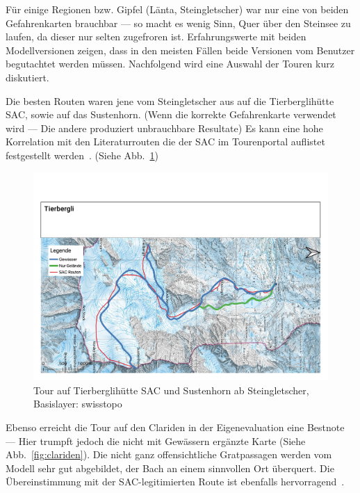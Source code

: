 Für einige Regionen bzw. Gipfel (Länta, Steingletscher) war nur eine von beiden Gefahrenkarten brauchbar --- so macht es wenig Sinn, Quer über den Steinsee zu laufen, da dieser nur selten zugefroren ist. Erfahrungswerte mit beiden Modellversionen zeigen, dass in den meisten Fällen beide Versionen vom Benutzer begutachtet werden müssen.
Nachfolgend wird eine Auswahl der Touren kurz diskutiert.

Die besten Routen waren jene vom Steingletscher aus auf die Tierberglihütte SAC, sowie auf das Sustenhorn. (Wenn die korrekte Gefahrenkarte verwendet wird --- Die andere produziert unbrauchbare Resultate) Es kann eine hohe Korrelation mit den Literaturrouten die der SAC im Tourenportal auflistet festgestellt werden~\cite{mmzentralch}. (Siehe Abb.\ \ref{fig:tierbergli})

\begin{figure}[ht]
  \centering
  \includegraphics[page=1,width=.9\linewidth]{./../evaluation/PDFs/Tierbergli.pdf}
  \caption{Tour auf Tierberglihütte SAC und Sustenhorn ab Steingletscher, \\Basislayer: swisstopo}\label{fig:tierbergli}
\end{figure}


Ebenso erreicht die Tour auf den Clariden in der Eigenevaluation eine Bestnote --- Hier trumpft jedoch die nicht mit Gewässern ergänzte Karte (Siehe Abb.\ \ref{fig:clariden}). Die nicht ganz offensichtliche Gratpassagen werden vom Modell sehr gut abgebildet, der Bach an einem sinnvollen Ort überquert. Die Übereinstimmung mit der SAC-legitimierten Route ist ebenfalls hervorragend~\cite{twslstgallappzll}.

